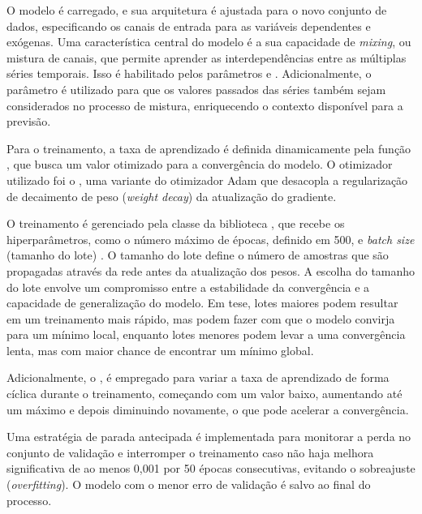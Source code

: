 O modelo  é carregado, e sua arquitetura é ajustada para o novo conjunto de dados, especificando 
os canais de entrada para as variáveis dependentes e exógenas. Uma característica central do modelo é a sua capacidade de 
\textit{mixing}, ou mistura de canais, que permite aprender as interdependências entre as múltiplas séries temporais. Isso é 
habilitado pelos parâmetros  e . Adicionalmente, 
o parâmetro  é utilizado para que os valores passados das séries também sejam considerados no processo 
de mistura, enriquecendo o contexto disponível para a previsão.

Para o treinamento, a taxa de aprendizado  é definida dinamicamente pela função , 
que busca um valor otimizado para a convergência do modelo. O otimizador utilizado foi o , uma variante do otimizador 
Adam que desacopla a regularização de decaimento de peso (\textit{weight decay}) da atualização do gradiente.

O treinamento é gerenciado pela classe  da biblioteca , que recebe os hiperparâmetros, 
como o número máximo de épocas, definido em 500, e \textit{batch size} (tamanho do lote) . O tamanho
do lote define o número de amostras que são propagadas através da rede antes da atualização dos pesos. A escolha do tamanho
do lote envolve um compromisso entre a estabilidade da convergência e a capacidade de generalização do modelo. Em tese, 
lotes maiores podem resultar em um treinamento mais rápido, mas podem fazer com que o modelo convirja para um mínimo local, 
enquanto lotes menores podem levar a uma convergência lenta, mas com maior chance de encontrar um mínimo global.

Adicionalmente, o , é empregado para variar a taxa de aprendizado de forma cíclica durante o treinamento, 
começando com um valor baixo, aumentando até um máximo e depois diminuindo novamente, o que pode acelerar a convergência.

Uma estratégia de parada antecipada  é implementada para monitorar a perda no conjunto de validação 
e interromper o treinamento caso não haja melhora significativa de ao menos 0,001 por 50 épocas consecutivas, 
evitando o sobreajuste (\textit{overfitting}). O modelo com o menor erro de validação é salvo ao final do processo.